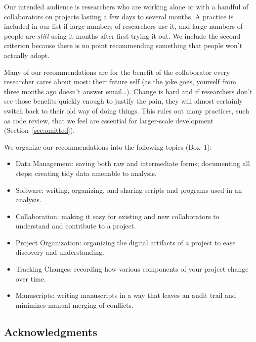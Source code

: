 \documentclass[10pt,letterpaper]{article}
\begin{document}
Our intended audience is researchers who are working alone or with a
handful of collaborators on projects lasting a few days to several
months. A practice is included in our list if large numbers of
researchers use it, and large numbers of people are \emph{still} using
it months after first trying it out. We include the second criterion
because there is no point recommending something that people won't
actually adopt.

Many of our recommendations are for the benefit of the collaborator
every researcher cares about most: their future self (as the
joke goes, yourself from three months ago doesn't answer
email{\ldots}). Change is hard and if researchers don't see those
benefits quickly enough to justify the pain, they will almost
certainly switch back to their old way of doing things.  This rules
out many practices, such as code review, that we feel are essential
for larger-scale development (Section~\ref{sec:omitted}).

We organize our recommendations into the following topics (Box~1):

\begin{itemize}

\item Data Management:
  saving both raw and intermediate forms; documenting all steps;
  creating tidy data amenable to analysis.

\item Software:
  writing, organizing, and sharing scripts and programs used in an
  analysis.

\item Collaboration:
  making it easy for existing and new collaborators to understand and
  contribute to a project.

\item Project Organization:
  organizing the digital artifacts of a project to ease discovery and
  understanding.

\item Tracking Changes:
  recording how various components of your project change over time.

\item Manuscripts:
  writing manuscripts in a way that leaves an audit trail and
  minimizes manual merging of conflicts.

\end{itemize}

\subsection*{Acknowledgments}
\end{document}

